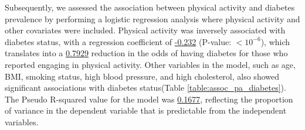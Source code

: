 \documentclass[11pt]{article}
\begin{document}
\begin{table}[h]
\caption{\protect\hyperlink{file-table-0-pkl}{Descriptive Statistics of Physical Activity Stratified by Diabetes Presence}}
\label{table:desc_stats}
\begin{threeparttable}
\renewcommand{\TPTminimum}{\linewidth}
\begin{tablenotes}
\footnotesize
\item 
\end{tablenotes}
\end{threeparttable}
\end{table}


Subsequently, we assessed the association between physical activity and diabetes prevalence by performing a logistic regression analysis where physical activity and other covariates were included. Physical activity was inversely associated with diabetes status, with a regression coefficient of \hyperlink{B1a}{-0.232} (P-value: $<$\hyperlink{B1d}{$10^{-6}$}), which translates into a \hyperlink{results0}{0.7929} reduction in the odds of having diabetes for those who reported engaging in physical activity. Other variables in the model, such as age, BMI, smoking status, high blood pressure, and high cholesterol, also showed significant associations with diabetes status(Table {}\ref{table:assoc_pa_diabetes}). The Pseudo R-squared value for the model was \hyperlink{R1a}{0.1677}, reflecting the proportion of variance in the dependent variable that is predictable from the independent variables.
\end{document}
